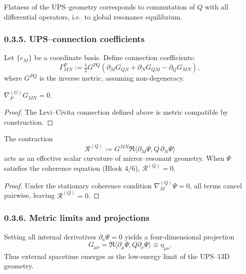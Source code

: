 \begin{corollary}
Flatness of the UPS–geometry corresponds to commutation of $Q$ with all differential operators,
i.e.\ to global resonance equilibrium.
\end{corollary}

\subsubsection*{0.3.5. UPS–connection coefficients}

Let $\{e_M\}$ be a coordinate basis. Define connection coefficients:
\[
\Gamma^P_{MN}
:= \tfrac12 G^{PQ}
  \left(
    \partial_M G_{QN} + \partial_N G_{QM} - \partial_Q G_{MN}
  \right),
\]
where $G^{PQ}$ is the inverse metric, assuming non-degeneracy.

\begin{lemma}
$\nabla_P^{(G)} G_{MN}=0$.
\end{lemma}

\begin{proof}
The Levi–Civita connection defined above is metric compatible by construction.
\end{proof}

\begin{proposition}
The contraction
\[
\mathcal{R}^{(Q)} := G^{MN}\Re\langle \partial_M\Psi,Q\,\partial_N\Psi\rangle
\]
acts as an effective scalar curvature of mirror–resonant geometry.
When $\Psi$ satisfies the coherence equation (Block 4/6), $\mathcal{R}^{(Q)}=0$.
\end{proposition}

\begin{proof}
Under the stationary coherence condition $\nabla^{(Q)}_M\Psi=0$, all terms cancel pairwise, leaving $\mathcal{R}^{(Q)}=0$.
\end{proof}

\subsubsection*{0.3.6. Metric limits and projections}

\begin{proposition}
Setting all internal derivatives $\partial_a\Psi=0$ yields a four-dimensional projection
\[
G_{\mu\nu}=\Re\langle \partial_\mu\Psi,Q\partial_\nu\Psi\rangle\equiv \eta_{\mu\nu}.
\]
Thus external spacetime emerges as the low-energy limit of the UPS–13D geometry.
\end{proposition}

